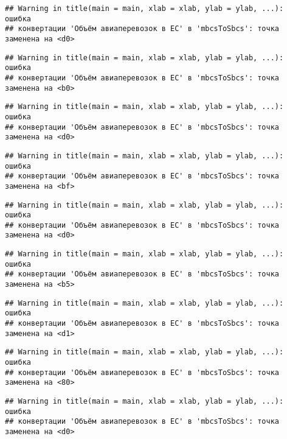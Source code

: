 \documentclass[
]{article}
\begin{document}
\begin{verbatim}
## Warning in title(main = main, xlab = xlab, ylab = ylab, ...): ошибка
## конвертации 'Объём авиаперевозок в ЕС' в 'mbcsToSbcs': точка заменена на <d0>
\end{verbatim}

\begin{verbatim}
## Warning in title(main = main, xlab = xlab, ylab = ylab, ...): ошибка
## конвертации 'Объём авиаперевозок в ЕС' в 'mbcsToSbcs': точка заменена на <b0>
\end{verbatim}

\begin{verbatim}
## Warning in title(main = main, xlab = xlab, ylab = ylab, ...): ошибка
## конвертации 'Объём авиаперевозок в ЕС' в 'mbcsToSbcs': точка заменена на <d0>
\end{verbatim}

\begin{verbatim}
## Warning in title(main = main, xlab = xlab, ylab = ylab, ...): ошибка
## конвертации 'Объём авиаперевозок в ЕС' в 'mbcsToSbcs': точка заменена на <bf>
\end{verbatim}

\begin{verbatim}
## Warning in title(main = main, xlab = xlab, ylab = ylab, ...): ошибка
## конвертации 'Объём авиаперевозок в ЕС' в 'mbcsToSbcs': точка заменена на <d0>
\end{verbatim}

\begin{verbatim}
## Warning in title(main = main, xlab = xlab, ylab = ylab, ...): ошибка
## конвертации 'Объём авиаперевозок в ЕС' в 'mbcsToSbcs': точка заменена на <b5>
\end{verbatim}

\begin{verbatim}
## Warning in title(main = main, xlab = xlab, ylab = ylab, ...): ошибка
## конвертации 'Объём авиаперевозок в ЕС' в 'mbcsToSbcs': точка заменена на <d1>
\end{verbatim}

\begin{verbatim}
## Warning in title(main = main, xlab = xlab, ylab = ylab, ...): ошибка
## конвертации 'Объём авиаперевозок в ЕС' в 'mbcsToSbcs': точка заменена на <80>
\end{verbatim}

\begin{verbatim}
## Warning in title(main = main, xlab = xlab, ylab = ylab, ...): ошибка
## конвертации 'Объём авиаперевозок в ЕС' в 'mbcsToSbcs': точка заменена на <d0>
\end{verbatim}
\end{document}
